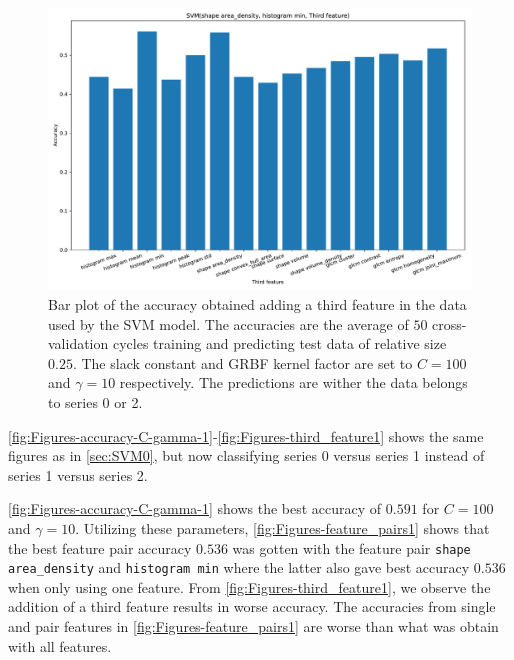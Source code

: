 \begin{figure}[H]
\centering
\includegraphics[width=1\textwidth]{Figures/third_feature1}
\caption{Bar plot of the accuracy obtained adding a third feature in the data used 
by the SVM model. The accuracies are the average 
of $50$ cross-validation cycles training and predicting test data of relative size $0.25$.
The slack constant and GRBF kernel factor are set to $C=100$ and $\gamma=10 $ respectively. 
 The predictions are wither the data belongs to series 0 or 2.}
\label{fig:Figures-third_feature1}
\end{figure}

\autoref{fig:Figures-accuracy-C-gamma-1}-\autoref{fig:Figures-third_feature1} shows the same figures as in \autoref{sec:SVM0}, but now 
classifying series 0 versus series 1 instead of series 1 versus series 2.

\autoref{fig:Figures-accuracy-C-gamma-1} shows the best accuracy of $0.591$  for $C=100$ and $\gamma =10$.
Utilizing these parameters, \autoref{fig:Figures-feature_pairs1} shows that the best feature pair accuracy $0.536$ was gotten with the feature pair 
\verb|shape area_density| and \verb|histogram min| where the latter also gave best accuracy $0.536$ when only using one feature.
From \autoref{fig:Figures-third_feature1}, we observe the addition of a third feature results in worse accuracy. 
The accuracies from single and pair features in \autoref{fig:Figures-feature_pairs1} are worse than what was obtain 
with all features. 

